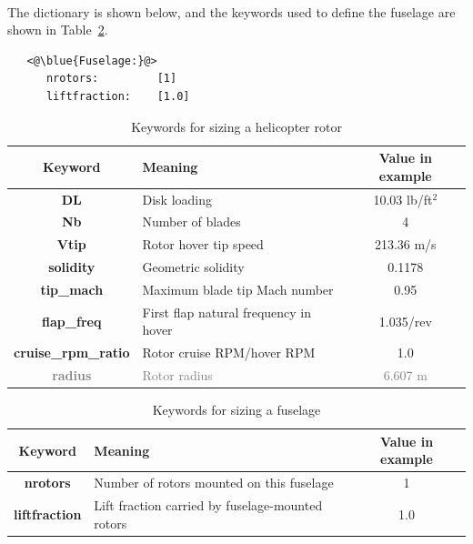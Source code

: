 \paragraph{}
The  dictionary is shown below, and the keywords used to define the fuselage are shown in Table~\ref{tbl:fuselage_keywords}.
\begin{lstlisting}
   <@\blue{Fuselage:}@>
      nrotors:         [1]
      liftfraction:    [1.0]
\end{lstlisting}

\begin{center}
  \begin{table}[H]
	\caption{Keywords for sizing a helicopter rotor}
	\label{tbl:rotor_keywords}
    \begin{tabular}{| c | l | c |}
    \hline
    Keyword & Meaning & Value in example \\ 
    \hline
\textbf{DL} & Disk loading & 10.03 lb/ft$^2$ \\
\textbf{Nb} & Number of blades & 4 \\
\textbf{Vtip} & Rotor hover tip speed & 213.36 m/s \\
\textbf{solidity} & Geometric solidity & 0.1178 \\
\textbf{tip\_mach} & Maximum blade tip Mach number & 0.95 \\
\textbf{flap\_freq} & First flap natural frequency in hover & 1.035/rev \\
\textbf{cruise\_rpm\_ratio} & Rotor cruise RPM/hover RPM & 1.0\\
\textcolor{gray}{\textbf{radius}} & \textcolor{gray}{Rotor radius} & \textcolor{gray}{6.607 m} \\
    \hline
  \end{tabular}
\end{table}
\end{center}
\begin{center}
  \begin{table}[H]
	\caption{Keywords for sizing a fuselage}
	\label{tbl:fuselage_keywords}
    \begin{tabular}{| c | l | c |}
    \hline
    Keyword & Meaning & Value in example \\ 
    \hline
\textbf{nrotors} & Number of rotors mounted on this fuselage & 1 \\
\textbf{liftfraction} & Lift fraction carried by fuselage-mounted rotors & 1.0 \\
    \hline
  \end{tabular}
\end{table}
\end{center}

